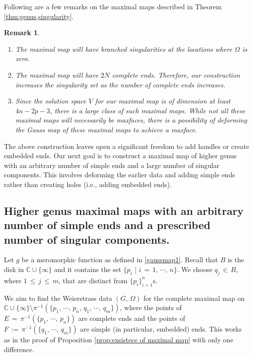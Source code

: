 \documentclass[12pt]{amsart}
\newtheorem{remark}[theorem]{Remark}
\numberwithin{equation}{section}
\begin{document}
Following are a few remarks on the maximal maps described in Theorem \ref{thm:genus,singularity}.

\begin{remark}\mbox{}
\begin{enumerate}
\item The maximal map will have branched singularities at the locations where \(\Omega\) is zero.

\item The maximal map  will have \(2N\) complete ends. Therefore, our construction increases the singularity set as the number of complete ends increases.

\item Since the solution space \(V\) for our maximal map is of dimension at least \(4n-2p-3\), there is a large class of such maximal maps. While not all these maximal maps will necessarily be maxfaces, there is a possibility of deforming the Gauss map of these maximal maps to achieve a maxface.
\end{enumerate}
\end{remark}

The above construction leaves open a significant freedom to add handles or create embedded ends. Our next goal 
is to construct a maximal map of higher genus with an arbitrary number of simple ends and a large number of 
singular components. This involves deforming the earlier data and adding simple ends rather than creating 
holes (i.e., adding embedded ends).


\subsection{Higher genus maximal maps with an arbitrary number of simple ends and a prescribed number of 
singular components.}\label{subsec:Simpleends}

Let \( g \) be a meromorphic function as defined in \eqref{gaussmap1}. Recall that \( B \) is the disk in $\mathbb{C}\cup\{\infty\}$ and it contains the set \( \{ p_i\,\,\big\vert\,\, i \,=\, 1, \,\cdots,\, n \} \). We choose \( q_j
\,\in\, B \), where \( 1 \,\leq\, j \,\leq\, m \), that are distinct from \(\{ p_i\}_{i=1}^n \)s.

We aim to find the Weierstrass data \((G, \,\Omega)\) for the complete maximal map on \(\mathbb{C} \cup \{\infty\} \setminus 
\pi^{-1}\left(\{p_1,\, \cdots,\, p_n,\, q_1,\, \cdots,\, q_m\}\right)\), where the points of \(E\, =\, \pi^{-1}(\{p_1,\, \cdots,\, p_n\})\)
are complete ends 
and the points of \(F\,:=\, \pi^{-1}(\{q_1,\,\cdots,\, q_m\})\) are simple (in particular, embedded) ends. This works as in the proof
of Proposition \ref{prop:exsistece of maximal map} with only one difference.
\end{document}
